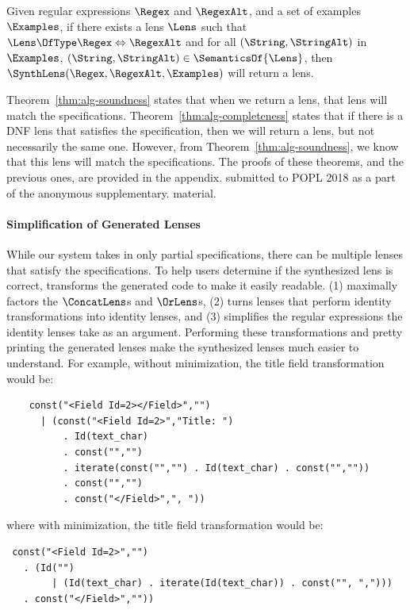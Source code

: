 \documentclass[sigplan,acmsmall]{acmart}
\begin{document}
\begin{theorem}
  \label{thm:alg-completeness}
  Given regular expressions $\Regex$ and $\RegexAlt$, and a set
  of examples $\Examples$, if there exists a lens $\Lens$ such that
  $\Lens \OfType \Regex \Leftrightarrow \RegexAlt$ and for all
  $(\String,\StringAlt)$ in $\Examples$, $(\String,\StringAlt) \in
  \SemanticsOf{\Lens}$, then $\SynthLens(\Regex,\RegexAlt,\Examples)$ will
  return a lens.
\end{theorem}

Theorem~\ref{thm:alg-soundness} states that when we return a lens, that 
lens will match the specifications.  Theorem~\ref{thm:alg-completeness} states
that if there is a DNF lens that satisfies the specification, then we will
return a lens, but not necessarily the same one.  However, from
Theorem~\ref{thm:alg-soundness}, we know that this lens will match the
specifications.  The proofs of these theorems, and the previous ones,
are
\ifappendices
provided in the appendix.
\else
submitted to POPL 2018 as a part of the anonymous supplementary.
material.
\fi

\paragraph*{Simplification of Generated Lenses}
While our system takes in only partial specifications, there can be multiple
lenses that satisfy the specifications.  To help users
determine if the synthesized lens is correct, \Optician{} transforms the
generated code to make it easily readable.  \Optician{} (1) maximally 
factors the $\ConcatLens$s and $\OrLens$s, (2) turns lenses that perform identity
transformations into identity lenses, and (3) simplifies the regular expressions
the identity lenses take as an argument.  Performing these transformations and
pretty printing the generated lenses make the synthesized lenses much easier to
understand.  For example, without minimization, the title field transformation
would be:
%
\begin{lstlisting}
    const("<Field Id=2></Field>","")
      | (const("<Field Id=2>","Title: ")
          . Id(text_char)
          . const("","")
          . iterate(const("","") . Id(text_char) . const("",""))
          . const("","")
          . const("</Field>",", "))
\end{lstlisting}
%
where with minimization, the title field transformation would be:
%
\begin{lstlisting}
 const("<Field Id=2>","")
   . (Id("")
        | (Id(text_char) . iterate(Id(text_char)) . const("", ",")))
   . const("</Field>",""))
\end{lstlisting}
%
\end{document}
